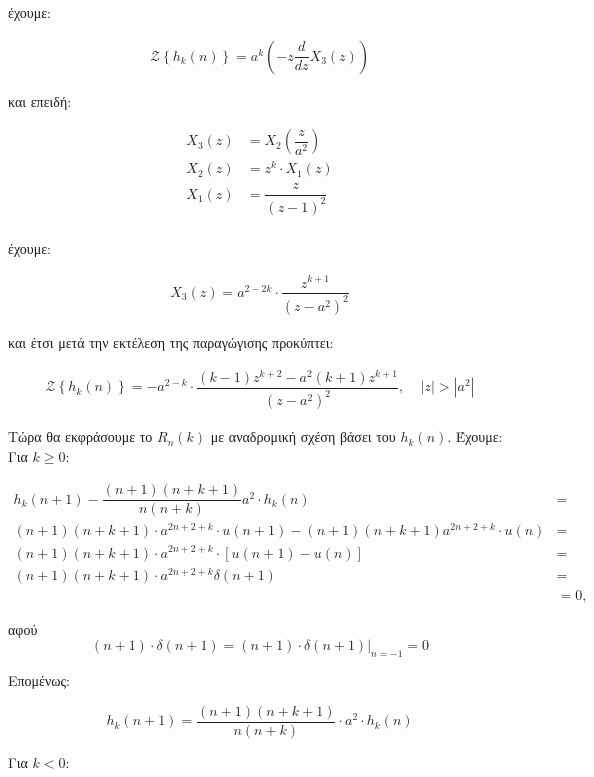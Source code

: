 \documentclass[12pt,a4paper]{article}
\begin{document}
			έχουμε:
			
			\begin{align*}
				\mathcal{Z}\left\{h_k(n)\right\} = a^k\left(-z\dfrac{d}{dz}X_3(z)\right) 
			\end{align*}
			
			και επειδή:
			
			\begin{align*}
				X_3(z) &= X_2\left(\dfrac{z}{a^2}\right) \\
				X_2(z) &= z^k \cdot X_1(z) \\
				X_1(z) &= \dfrac{z}{(z-1)^2} \\
			\end{align*}
			
			έχουμε:
			
			\begin{align*}
				X_3(z) = a^{2-2k} \cdot \dfrac{z^{k+1}}{\left(z-a^2\right)^2}
			\end{align*}
			
			και έτσι μετά την εκτέλεση της παραγώγισης προκύπτει:
			
			\begin{align*}
				\mathcal{Z}\left\{h_k(n)\right\} = -a^{2-k} \cdot \dfrac{(k-1)z^{k+2}-a^2(k+1)z^{k+1}}{\left(z-a^2\right)^2}, ~~~~~|z| > |a^2|
			\end{align*}

			Τώρα θα εκφράσουμε το $R_n(k)$ με αναδρομική σχέση βάσει του $h_k(n)$. Έχουμε: \\
			
			Για $k \geq 0$:
			
			\begin{align*}
				h_k(n+1) - \dfrac{(n+1)(n+k+1)}{n(n+k)}a^2 \cdot h_k(n) &= \\  (n+1)(n+k+1) \cdot a^{2n+2+k} \cdot u(n+1)-(n+1)(n+k+1)a^{2n+2+k} \cdot u(n) &= \\
				(n+1)(n+k+1) \cdot a^{2n+2+k} \cdot \left[u(n+1)-u(n)\right] &= \\
				(n+1)(n+k+1) \cdot a^{2n+2+k}\delta(n+1) &= \\
				&= 0,
			\end{align*}
			
			αφού 
			\[
				(n+1) \cdot \delta(n+1) = (n+1) \cdot \delta(n+1)\Big|_{n=-1} = 0 
			\]
			
			Επομένως:
			
			\[
				h_k(n+1) = \dfrac{(n+1)(n+k+1)}{n(n+k)} \cdot a^2 \cdot h_k(n)
			\]
			
			Για $k < 0$:
					
\end{document}
